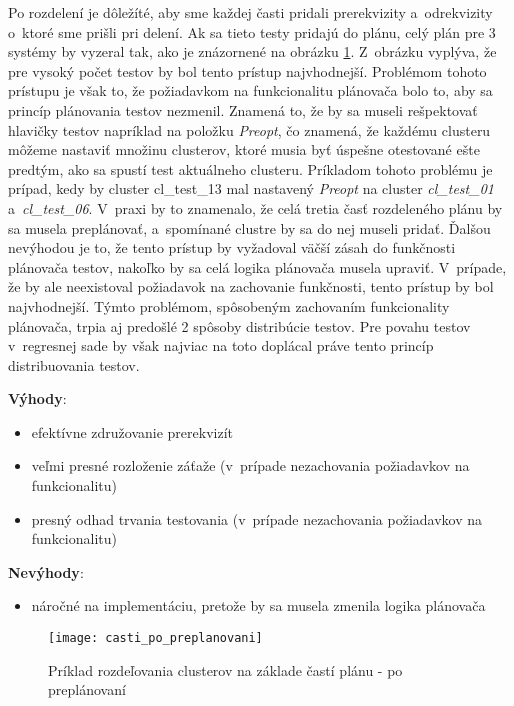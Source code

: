 Po rozdelení je dôležíté, aby sme každej časti pridali prerekvizity a~odrekvizity
o~ktoré sme prišli pri delení. Ak sa tieto testy pridajú do plánu, celý plán
pre 3 systémy by vyzeral tak, ako je znázornené na obrázku \ref{obrazok:distribucia_casti_po_preplanovani}.
Z~obrázku vyplýva, že pre vysoký počet testov by bol tento prístup najvhodnejší.
Problémom tohoto prístupu je však to, že požiadavkom na funkcionalitu plánovača bolo to,
aby sa princíp plánovania testov nezmenil. Znamená to, že by sa museli rešpektovať hlavičky testov
napríklad na položku \emph{Preopt}, čo znamená, že každému clusteru môžeme nastaviť množinu clusterov,
ktoré musia byť úspešne otestované ešte predtým, ako sa spustí test aktuálneho clusteru.
Príkladom tohoto problému je prípad, kedy by cluster cl\_test\_13 mal nastavený 
\emph{Preopt} na cluster \emph{cl\_test\_01} a~\emph{cl\_test\_06}.
V~praxi by to znamenalo, že celá tretia časť rozdeleného plánu by sa musela preplánovať,
a~spomínané clustre by sa do nej museli pridať. Ďalšou nevýhodou je to, že tento prístup by
vyžadoval väčší zásah do funkčnosti plánovača testov, nakoľko by sa celá logika plánovača musela upraviť.
V~prípade, že by ale neexistoval požiadavok na zachovanie funkčnosti, tento prístup by bol najvhodnejší.
Týmto problémom, spôsobeným zachovaním funkcionality plánovača, trpia aj predošlé 2 spôsoby distribúcie testov. 
Pre povahu testov v~regresnej sade by však najviac na toto doplácal práve tento princíp distribuovania testov.  

\noindent \textbf{Výhody}:
\begin{itemize}
\item efektívne združovanie prerekvizít
\item veľmi presné rozloženie záťaže (v~prípade nezachovania požiadavkov na funkcionalitu)
\item presný odhad trvania testovania (v~prípade nezachovania požiadavkov na funkcionalitu)
\end{itemize} 

\noindent \textbf{Nevýhody}:
\begin{itemize}
\item náročné na implementáciu, pretože by sa musela zmenila logika plánovača
\end{itemize}

\begin{figure}[h]
  \begin{center}
    \texttt{[image: casti\_po\_preplanovani]}
    \caption{Príklad rozdeľovania clusterov na základe častí plánu - po preplánovaní}
    \label{obrazok:distribucia_casti_po_preplanovani}
  \end{center}
\end{figure}

